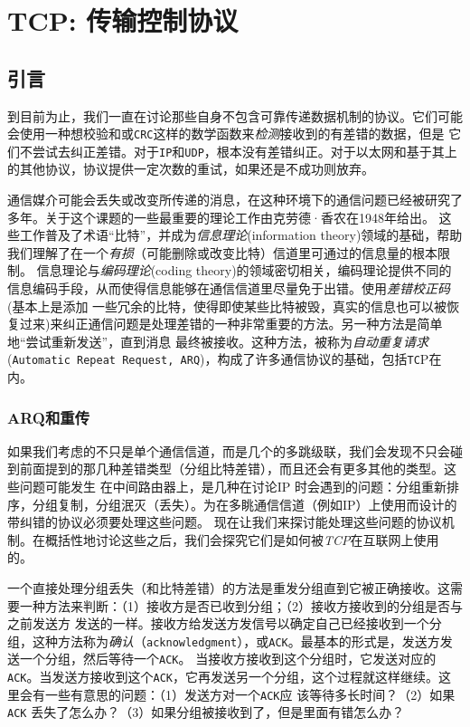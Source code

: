 \chapter{TCP: 传输控制协议}
\minitoc

\section{引言}
到目前为止，我们一直在讨论那些自身不包含可靠传递数据机制的协议。它们可能会使用一种想校验和或\verb|CRC|这样的数学函数来\emph{检测}接收到的有差错的数据，但是
它们不尝试去纠正差错。对于\verb|IP|和\verb|UDP|，根本没有差错纠正。对于以太网和基于其上的其他协议，协议提供一定次数的重试，如果还是不成功则放弃。

通信媒介可能会丢失或改变所传递的消息，在这种环境下的通信问题已经被研究了多年。关于这个课题的一些最重要的理论工作由克劳德·香农在1948年给出。
这些工作普及了术语“比特”，并成为\emph{信息理论}(information theory)领域的基础，帮助我们理解了在一个\emph{有损}（可能删除或改变比特）信道里可通过的信息量的根本限制。
信息理论与\emph{编码理论}(coding theory)的领域密切相关，编码理论提供不同的信息编码手段，从而使得信息能够在通信信道里尽量免于出错。使用\emph{差错校正码}(基本上是添加
一些冗余的比特，使得即使某些比特被毁，真实的信息也可以被恢复过来)来纠正通信问题是处理差错的一种非常重要的方法。另一种方法是简单地“尝试重新发送”，直到消息
最终被接收。这种方法，被称为\emph{自动重复请求} (\verb|Automatic Repeat Request, ARQ|)，构成了许多通信协议的基础，包括\verb|TC|P在内。
\subsection{ARQ和重传}
如果我们考虑的不只是单个通信信道，而是几个的多跳级联，我们会发现不只会碰到前面提到的那几种差错类型（分组比特差错），而且还会有更多其他的类型。这些问题可能发生
在中间路由器上，是几种在讨论IP 时会遇到的问题：分组重新排序，分组复制，分组泯灭（丢失）。为在多眺通信信道（例如IP）上使用而设计的带纠错的协议必须要处理这些问题。
现在让我们来探讨能处理这些问题的协议机制。在概括性地讨论这些之后，我们会探究它们是如何被\emph{TCP}在互联网上使用的。

一个直接处理分组丢失（和比特差错）的方法是重发分组直到它被正确接收。这需要一种方法来判断：（1）接收方是否已收到分组；（2）接收方接收到的分组是否与之前发送方
发送的一样。接收方给发送方发信号以确定自己已经接收到一个分组，这种方法称为\emph{确认}（\verb|acknowledgment|），或\verb|ACK|。最基本的形式是，发送方发送一个分组，然后等待一个\verb|ACK|。
当接收方接收到这个分组时，它发送对应的\verb|ACK|。当发送方接收到这个\verb|ACK|，它再发送另一个分组，这个过程就这样继续。这里会有一些有意思的问题：（1）发送方对一个\verb|ACK|应
该等待多长时间？（2）如果 \verb|ACK| 丢失了怎么办？（3）如果分组被接收到了，但是里面有错怎么办？

